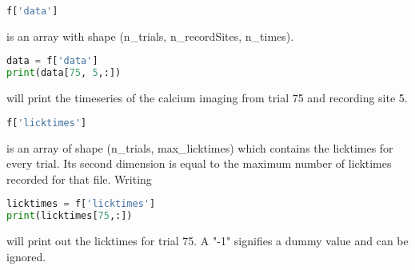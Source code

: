 \documentclass[12pt]{article}
\begin{document}
\begin{lstlisting}[language=Python]
f['data']
\end{lstlisting}
is an array with shape (n\_trials, n\_recordSites, n\_times).
\begin{lstlisting}[language=Python]
data = f['data']
print(data[75, 5,:])
\end{lstlisting}
will print the timeseries of the calcium imaging from trial 75 and recording site 5. \newline

\begin{lstlisting}[language=Python]
f['licktimes']
\end{lstlisting}
is an array of shape (n\_trials, max\_licktimes) which contains the licktimes for every trial. Its second dimension is equal to the maximum number of licktimes recorded for that file. Writing
\begin{lstlisting}[language=Python]
licktimes = f['licktimes']
print(licktimes[75,:])
\end{lstlisting}
will print out the licktimes for trial 75. A "-1" signifies a dummy value and can be ignored.
\end{document}
